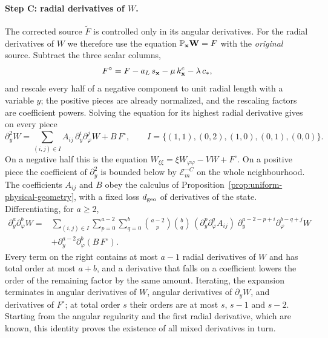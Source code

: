 \paragraph{Step C: radial derivatives of $W$.}
The corrected source $\widetilde F$ is controlled only in its angular
derivatives. For the radial derivatives of $W$ we therefore use the
equation $\mathbb P_{\mathbf x}\mathbf W=F$ with the \emph{original} source.
Subtract the three scalar columns,
\[
 F^\circ=F-a_L\,s_{\mathbf x}-\mu\,k_{\mathbf x}^c-\lambda\,c_* ,
\]
and rescale every half of a negative component to unit radial length
with a variable $y$; the positive pieces are already normalized, and
the rescaling factors are coefficient powers. Solving the equation
for its highest radial derivative gives on every piece
\begin{equation}\label{eq:rewrite-normal-recursion-base}
 \partial_y^2W=\sum_{(i,j)\in I}A_{ij}\,\partial_y^i
                      \partial_\varphi^jW+B\,F^\circ,\qquad
 I=\{(1,1),(0,2),(1,0),(0,1),(0,0)\} .
\end{equation}
On a negative half this is the equation
$W_{\xi\xi}=\xi W_{\varphi\varphi}-VW+F^\circ$. On a positive piece
the coefficient of $\partial_y^2$ is bounded below by
$\mathcal E_m^{-C}$ on the whole neighbourhood. The coefficients
$A_{ij}$ and $B$ obey the calculus of
Proposition~\ref{prop:uniform-physical-geometry}, with a fixed loss
$d_{\rm geo}$ of derivatives of the state. Differentiating, for
$a\ge2$,
\begin{equation}\label{eq:rewrite-mixed-normal-recursion}
 \begin{split}
 \partial_y^a\partial_\varphi^b W
 ={}&\sum_{(i,j)\in I}\sum_{p=0}^{a-2}\sum_{q=0}^{b}
       \binom{a-2}{p}\binom bq\,
       (\partial_y^p\partial_\varphi^q A_{ij})\;
       \partial_y^{a-2-p+i}\partial_\varphi^{b-q+j}W\\
 &+\partial_y^{a-2}\partial_\varphi^b(B\,F^\circ) .
 \end{split}
\end{equation}
Every term on the right contains at most $a-1$ radial derivatives of
$W$ and has total order at most $a+b$, and a derivative that falls on
a coefficient lowers the order of the remaining factor by the same
amount. Iterating, the expansion terminates in angular derivatives of
$W$, angular derivatives of $\partial_yW$, and derivatives of
$F^\circ$; at total order $s$ their orders are at most $s$, $s-1$ and
$s-2$. Starting from the angular regularity and the first radial
derivative, which are known, this identity proves the existence of
all mixed derivatives in turn.

